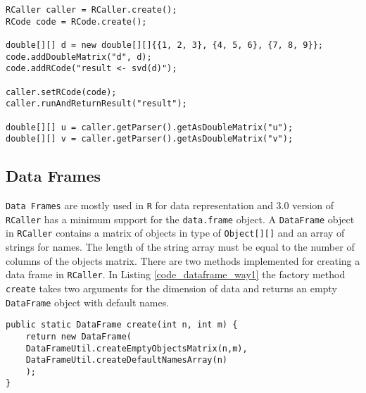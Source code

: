 \documentclass[10pt,a4paper, final, oneside]{article}
\begin{document}
\begin{minipage}{\linewidth}
\begin{lstlisting}[caption=Transferring Matrices,label=code_java_svd]
RCaller caller = RCaller.create();
RCode code = RCode.create();

double[][] d = new double[][]{{1, 2, 3}, {4, 5, 6}, {7, 8, 9}};
code.addDoubleMatrix("d", d);
code.addRCode("result <- svd(d)");

caller.setRCode(code);
caller.runAndReturnResult("result");

double[][] u = caller.getParser().getAsDoubleMatrix("u");
double[][] v = caller.getParser().getAsDoubleMatrix("v");
\end{lstlisting}
\end{minipage}


\subsection{Data Frames}
\label{sec:data_frames}
\texttt{Data Frames} are mostly used in \texttt{R} for data representation and $3.0$ version of \texttt{RCaller} has a minimum support for the \texttt{data.frame} object. A \texttt{DataFrame} object in \texttt{RCaller} contains a matrix of objects in type of \texttt{Object[][]} and an array of strings for names. The length of the string array must be equal to the number of columns of the objects matrix. There are two methods implemented for creating a data frame in \texttt{RCaller}. In Listing \ref{code_dataframe_way1} the factory method \texttt{create} takes two arguments for the dimension of data and returns an empty \texttt{DataFrame} object with default names. 


\begin{minipage}{\linewidth}
\begin{lstlisting}[caption=Default DataFrame Creator,label=code_dataframe_way1]
public static DataFrame create(int n, int m) {
    return new DataFrame(
    DataFrameUtil.createEmptyObjectsMatrix(n,m), 
    DataFrameUtil.createDefaultNamesArray(n)
    );
}
\end{lstlisting}
\end{minipage}
\end{document}
